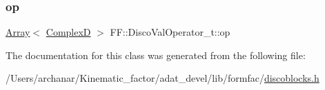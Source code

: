 \subsubsection{\texorpdfstring{op}{op}}
{\footnotesize\ttfamily \mbox{\hyperlink{classXMLArray_1_1Array}{Array}}$<$ \mbox{\hyperlink{group__defs_gaf38ee8c84f090ee0c3b76e7a384fb316}{ComplexD}} $>$ F\+F\+::\+Disco\+Val\+Operator\+\_\+t\+::op}



The documentation for this class was generated from the following file\+:\begin{DoxyCompactItemize}
\item 
/\+Users/archanar/\+Kinematic\+\_\+factor/adat\+\_\+devel/lib/formfac/\mbox{\hyperlink{lib_2formfac_2discoblocks_8h}{discoblocks.\+h}}\end{DoxyCompactItemize}
